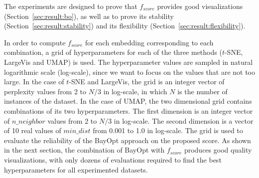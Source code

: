 The experiments are designed to prove that $f_{score}$ provides good visualizations (Section~\ref{sec:result:bo}), as well as to prove its stability (Section~\ref{sec:result:stability}) and its flexibility (Section~\ref{sec:result:flexibility}).

In order to compute $f_{score}$ for each embedding corresponding to each combination, a grid of hyperparameters for each of the three methods ($t$-SNE, LargeVis and UMAP) is used.
The hyperparameter values are sampled in natural logarithmic scale (log-scale), since we want to focus on the values that are not too large.
In the case of $t$-SNE and LargeVis, the grid is an integer vector of perplexity values from 2 to $N/3$ in log-scale, in which $N$ is the number of instances of the dataset.
In the case of UMAP, the two dimensional grid contains combinations of its two hyperparameters.
The first dimension is an integer vector of $n\_neighbor$ values from 2 to $N/3$ in log-scale.
The second dimension is a vector of 10 real values of $min\_dist$ from 0.001 to 1.0 in log-scale.
The grid is used to evaluate the reliability of the BayOpt approach on the proposed score.
As shown in the next section, the combination of BayOpt with $f_{score}$ produces good quality visualizations, with only dozens of evaluations required to find the best hyperparameters for all experimented datasets.


